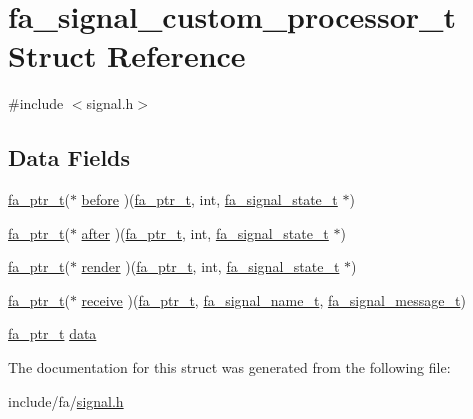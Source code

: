 \hypertarget{structfa__signal__custom__processor__t}{\section{fa\-\_\-signal\-\_\-custom\-\_\-processor\-\_\-t Struct Reference}
\label{structfa__signal__custom__processor__t}
}


{\ttfamily \#include $<$signal.\-h$>$}

\subsection*{Data Fields}
\begin{DoxyCompactItemize}
\item 
\hyperlink{group___fa_ga915ddeae99ad7568b273d2b876425197}{fa\-\_\-ptr\-\_\-t}($\ast$ \hyperlink{group___fa_ga31d1a146b5f551dfead9a6c399b4415b}{before} )(\hyperlink{group___fa_ga915ddeae99ad7568b273d2b876425197}{fa\-\_\-ptr\-\_\-t}, int, \hyperlink{structfa__signal__state__t}{fa\-\_\-signal\-\_\-state\-\_\-t} $\ast$)
\item 
\hyperlink{group___fa_ga915ddeae99ad7568b273d2b876425197}{fa\-\_\-ptr\-\_\-t}($\ast$ \hyperlink{group___fa_gab4584051c983a03a468d39b2d7dca09c}{after} )(\hyperlink{group___fa_ga915ddeae99ad7568b273d2b876425197}{fa\-\_\-ptr\-\_\-t}, int, \hyperlink{structfa__signal__state__t}{fa\-\_\-signal\-\_\-state\-\_\-t} $\ast$)
\item 
\hyperlink{group___fa_ga915ddeae99ad7568b273d2b876425197}{fa\-\_\-ptr\-\_\-t}($\ast$ \hyperlink{group___fa_ga3b4015e70f4950d6562f76f805e5b752}{render} )(\hyperlink{group___fa_ga915ddeae99ad7568b273d2b876425197}{fa\-\_\-ptr\-\_\-t}, int, \hyperlink{structfa__signal__state__t}{fa\-\_\-signal\-\_\-state\-\_\-t} $\ast$)
\item 
\hyperlink{group___fa_ga915ddeae99ad7568b273d2b876425197}{fa\-\_\-ptr\-\_\-t}($\ast$ \hyperlink{group___fa_ga16aa02edb4a60ee29ba77b0b572f4f51}{receive} )(\hyperlink{group___fa_ga915ddeae99ad7568b273d2b876425197}{fa\-\_\-ptr\-\_\-t}, \hyperlink{group___fa_signal_gabb3471c5e8fbc3ab8657964de4200d37}{fa\-\_\-signal\-\_\-name\-\_\-t}, \hyperlink{group___fa_signal_ga655db48baa224e32e8fc00f33179b46e}{fa\-\_\-signal\-\_\-message\-\_\-t})
\item 
\hyperlink{group___fa_ga915ddeae99ad7568b273d2b876425197}{fa\-\_\-ptr\-\_\-t} \hyperlink{group___fa_ga8ba1d44c953ef26dae26fddd936f5840}{data}
\end{DoxyCompactItemize}


The documentation for this struct was generated from the following file\-:\begin{DoxyCompactItemize}
\item 
include/fa/\hyperlink{signal_8h}{signal.\-h}\end{DoxyCompactItemize}
